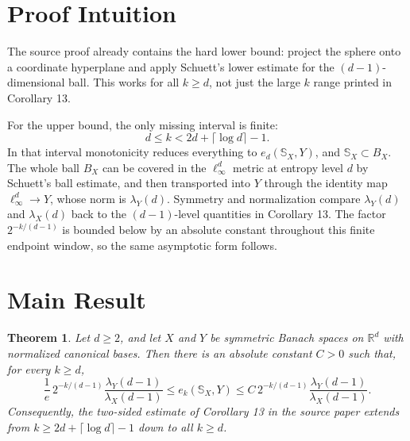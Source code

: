 \documentclass[11pt]{article}
\newtheorem{theorem}{Theorem}
\newcommand{\R}{\mathbb{R}}
\newcommand{\Sphere}{\mathbb{S}}
\begin{document}
\section*{Proof Intuition}

The source proof already contains the hard lower bound: project the sphere
onto a coordinate hyperplane and apply Schuett's lower estimate for the
\((d-1)\)-dimensional ball.  This works for all \(k\ge d\), not just the large
\(k\) range printed in Corollary 13.

For the upper bound, the only missing interval is finite:
\[
  d\le k<2d+\lceil\log d\rceil-1.
\]
In that interval monotonicity reduces everything to \(e_d(\Sphere_X,Y)\), and
\(\Sphere_X\subset B_X\).  The whole ball \(B_X\) can be covered in the
\(\ell_\infty^d\) metric at entropy level \(d\) by Schuett's ball estimate, and
then transported into \(Y\) through the identity map
\(\ell_\infty^d\to Y\), whose norm is \(\lambda_Y(d)\).  Symmetry and
normalization compare \(\lambda_Y(d)\) and \(\lambda_X(d)\) back to the
\((d-1)\)-level quantities in Corollary 13.  The factor
\(2^{-k/(d-1)}\) is bounded below by an absolute constant throughout this
finite endpoint window, so the same asymptotic form follows.

\section*{Main Result}

\begin{theorem}\label{thm:endpoint}
Let \(d\ge2\), and let \(X\) and \(Y\) be symmetric Banach spaces on
\(\R^d\) with normalized canonical bases.  Then there is an absolute constant
\(C>0\) such that, for every \(k\ge d\),
\[
  \frac{1}{e}\,2^{-k/(d-1)}
  \frac{\lambda_Y(d-1)}{\lambda_X(d-1)}
  \le
  e_k(\Sphere_X,Y)
  \le
  C\,2^{-k/(d-1)}
  \frac{\lambda_Y(d-1)}{\lambda_X(d-1)}.
\]
Consequently, the two-sided estimate of Corollary 13 in the source paper
extends from \(k\ge 2d+\lceil\log d\rceil-1\) down to all \(k\ge d\).
\end{theorem}
\end{document}
